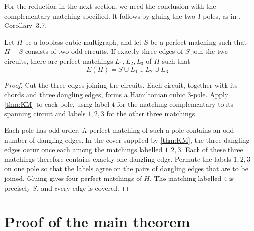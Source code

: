 \documentclass[justified,notoc,twoside,nobib,nofonts]{tufte-handout}
\begin{document}
For the reduction in the next section, we need the conclusion with
the complementary matching specified. It follows by gluing the two
$3$-poles, as in \citep{KM26}, Corollary~3.7.

\begin{lemma}\label{lem:three-spokes}
Let $H$ be a loopless cubic multigraph, and let $S$ be a perfect matching
such that $H-S$ consists of two odd circuits. If exactly three edges
of $S$ join the two circuits, there are perfect matchings $L_1,L_2,L_3$
of $H$ such that
\[
  E(H)=S\cup L_1\cup L_2\cup L_3.
\]
\end{lemma}
\begin{proof}
Cut the three edges joining the circuits. Each circuit, together with
its chords and three dangling edges, forms a Hamiltonian cubic
$3$-pole. Apply \cref{thm:KM} to each pole, using label $4$ for the
matching complementary to its spanning circuit and labels $1,2,3$
for the other three matchings.

Each pole has odd order. A perfect matching of such a pole contains
an odd number of dangling edges. In the cover supplied by
\cref{thm:KM}, the three dangling edges occur once each among the
matchings labelled $1,2,3$. Each of these three matchings therefore
contains exactly one dangling edge. Permute the labels $1,2,3$ on
one pole so that the labels agree on the pairs of dangling edges
that are to be joined. Gluing gives four perfect matchings of $H$.
The matching labelled $4$ is precisely $S$, and every edge is covered.
\end{proof}

\section{Proof of the main theorem}
\end{document}
